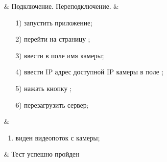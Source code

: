 \begin{longtable}
	 & Подключение. Переподключение. & 
   			\begin{enumerate}
				\item[1)] запустить приложение;
				\item[2)] перейти на страницу \addCameraPage{};
				\item[3)] ввести в поле \ipInput{} имя камеры;
				\item[4)] ввести IP адрес доступной IP камеры в поле \ipInput{};
				\item[5)] нажать кнопку \connectButton{};
				\item[6)] перезагрузить сервер;
			\end{enumerate}
   			& 
   			\begin{enumerate}
   				\item виден видеопоток с камеры;
   			\end{enumerate}
   			& Тест успешно пройден \\

   \hline
\end{longtable}

